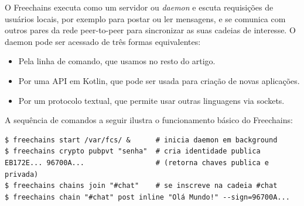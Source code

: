 \documentclass[12pt]{article}
\newcommand{\FC} {Freechains\xspace}
\begin{document}
O \FC executa como um servidor ou \emph{daemon} e escuta requisições de
usuários locais, por exemplo para postar ou ler mensagens, e se comunica com
outros pares da rede peer-to-peer para sincronizar as suas cadeias de
interesse.
O daemon pode ser acessado de três formas equivalentes:
%
\begin{itemize}
\item Pela linha de comando, que usamos no resto do artigo.
\item Por uma API em Kotlin, que pode ser usada para criação de novas aplicações.
\item Por um protocolo textual, que permite usar outras linguagens via sockets.
\end{itemize}
%

%
A sequência de comandos a seguir ilustra o funcionamento básico do \FC:
%
{\footnotesize
\begin{verbatim}
$ freechains start /var/fcs/ &      # inicia daemon em background
$ freechains crypto pubpvt "senha"  # cria identidade publica
EB172E... 96700A...                 # (retorna chaves publica e privada)
$ freechains chains join "#chat"    # se inscreve na cadeia #chat
$ freechains chain "#chat" post inline "Olá Mundo!" --sign=96700A...
\end{verbatim}
}
\end{document}
